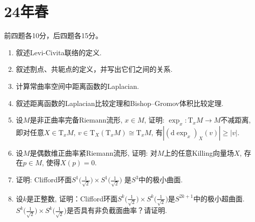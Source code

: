 \section{24年春}
前四题各10分，后四题各15分。
\begin{enumerate}
    \item[1.]叙述Levi-Civita联络的定义.
    \item[2.]叙述割点、共轭点的定义，并写出它们之间的关系.
    \item[3.]计算常曲率空间中距离函数的Laplacian.
    \item[4.]叙述距离函数的Laplacian比较定理和Bishop--Gromov体积比较定理.
    \item[5.]设$M$是非正曲率完备Riemann流形, $x\in M$, 
    证明: $\exp_x\colon \mathrm{T}_xM\rightarrow M$不减距离, 
    即对任意$X\in\mathrm{T}_xM$, $v\in\mathrm{T}_{X}(\mathrm{T}_xM)\cong\mathrm{T}_xM$, 
    有$\left|(\mathrm{d}\exp_x)_{X}(v)\right|\geq |v|$.
    \item[6.]设$M$是偶数维正曲率紧Riemann流形, 
    证明: 对$M$上的任意Killing向量场$X$, 存在$p\in M$, 使得$X(p)=0$.
    \item[7.]证明: Clifford环面$S^1\big(\frac{1}{\sqrt{2}}\big)\times S^1\big(\frac{1}{\sqrt{2}}\big)$
    是$S^3$中的极小曲面.
    \item[8.]设$k$是正整数, 证明：Clifford环面$S^k\big(\frac{1}{\sqrt{2}}\big)\times S^k\big(\frac{1}{\sqrt{2}}\big)$是$S^{2k+1}$中的极小超曲面. 
    $S^k\big(\frac{1}{\sqrt{2}}\big)\times S^k\big(\frac{1}{\sqrt{2}}\big)$是否具有非负截面曲率？请证明.
\end{enumerate}